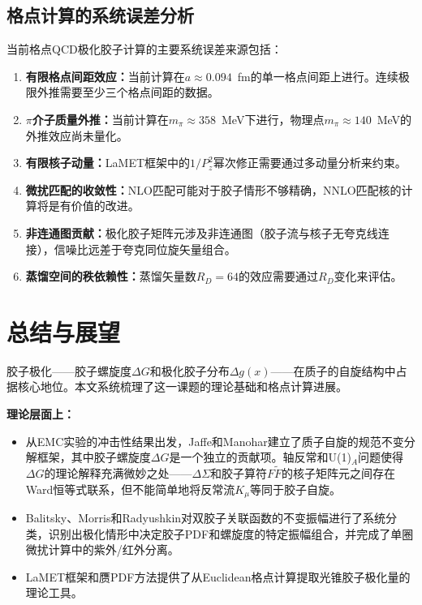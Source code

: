\documentclass[12pt,a4paper]{ctexart}
\theoremstyle{definition}
\begin{document}
\subsection{格点计算的系统误差分析}

当前格点QCD极化胶子计算的主要系统误差来源包括\cite{Egerer2022,Chen2025gluon}：

\begin{enumerate}
    \item \textbf{有限格点间距效应：}当前计算在$a \approx 0.094$~fm的单一格点间距上进行。连续极限外推需要至少三个格点间距的数据。
    \item \textbf{$\pi$介子质量外推：}当前计算在$m_\pi \approx 358$~MeV下进行，物理点$m_\pi \approx 140$~MeV的外推效应尚未量化。
    \item \textbf{有限核子动量：}LaMET框架中的$1/P_z^2$幂次修正需要通过多动量分析来约束。
    \item \textbf{微扰匹配的收敛性：}NLO匹配可能对于胶子情形不够精确，NNLO匹配核的计算将是有价值的改进。
    \item \textbf{非连通图贡献：}极化胶子矩阵元涉及非连通图（胶子流与核子无夸克线连接），信噪比远差于夸克同位旋矢量组合\cite{NoteGluonPDFs}。
    \item \textbf{蒸馏空间的秩依赖性：}蒸馏矢量数$R_D = 64$的效应需要通过$R_D$变化来评估\cite{Egerer2022}。
\end{enumerate}

\section{总结与展望}

胶子极化——胶子螺旋度$\Delta G$和极化胶子分布$\Delta g(x)$——在质子的自旋结构中占据核心地位。本文系统梳理了这一课题的理论基础和格点计算进展。

\textbf{理论层面上：}

\begin{itemize}
    \item 从EMC实验的冲击性结果出发，Jaffe和Manohar\cite{JaffeManohar1990}建立了质子自旋的规范不变分解框架，其中胶子螺旋度$\Delta G$是一个独立的贡献项。轴反常和U(1)$_A$问题使得$\Delta G$的理论解释充满微妙之处——$\Delta\Sigma$和胶子算符$F\tilde{F}$的核子矩阵元之间存在Ward恒等式联系，但不能简单地将反常流$K_\mu$等同于胶子自旋。
    \item Balitsky、Morris和Radyushkin\cite{Balitsky2020}对双胶子关联函数的不变振幅进行了系统分类，识别出极化情形中决定胶子PDF和螺旋度的特定振幅组合，并完成了单圈微扰计算中的紫外/红外分离。
    \item LaMET框架\cite{Ji2013Euclidean,Ji2014LaMET}和赝PDF方法\cite{Egerer2022}提供了从Euclidean格点计算提取光锥胶子极化量的理论工具。
\end{itemize}
\end{document}
